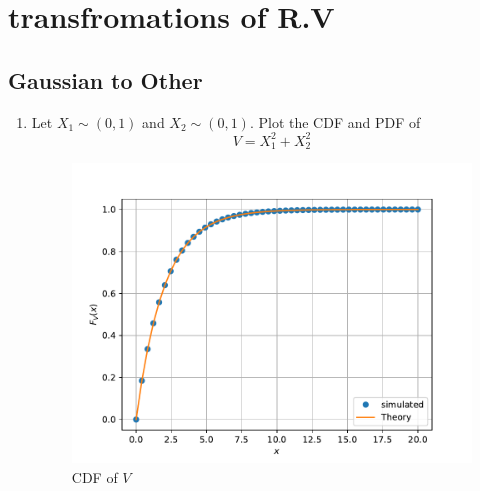 \documentclass[10pt, a4paper]{article}
\begin{document}
\section{transfromations of R.V}
\subsection{Gaussian to Other}
\begin{enumerate}
\item
Let $X_1 \sim  (0,1) $ and $X_2 \sim (0,1)$. Plot the CDF and PDF of
%
\begin{equation}
V = X_1^2 + X_2^2 
\end{equation}

\begin{center}
\end{center}
\begin{center}
\end{center}


\begin{figure}[!ht]
\centering
\includegraphics[scale=0.5]{images/7.1.1_CDF.pdf}
\caption{CDF of $V$}
\end{figure}


\end{enumerate}
\end{document}
